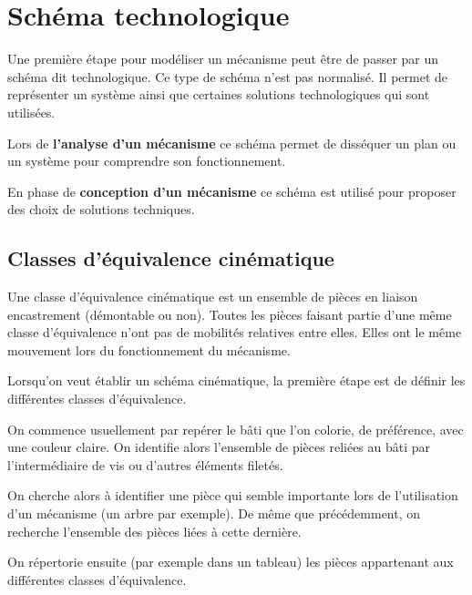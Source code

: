 \documentclass[10pt,oneside]{article}
\begin{document}
\section{Schéma technologique}
Une première étape pour modéliser un mécanisme peut être de passer par un schéma dit technologique. Ce type de schéma n'est pas normalisé. Il permet de représenter un système ainsi que certaines solutions technologiques qui sont utilisées. 

Lors de \textbf{l'analyse d'un mécanisme} ce schéma permet de disséquer un plan ou un système pour comprendre son fonctionnement. 

En phase de \textbf{conception d'un mécanisme} ce schéma est utilisé pour proposer des choix de solutions techniques. 

\subsection{Classes d'équivalence cinématique}

\begin{defi}
Une classe d'équivalence cinématique est un ensemble de pièces en liaison encastrement (démontable ou non). Toutes les pièces faisant partie d'une même classe d'équivalence n'ont pas de mobilités relatives entre elles. Elles ont le même mouvement lors du fonctionnement du mécanisme.
\end{defi}

Lorsqu'on veut établir un schéma cinématique, la première étape est de définir les différentes classes d'équivalence. 

\begin{methode}
On commence usuellement par repérer le bâti que l'on colorie, de préférence, avec une couleur claire. On identifie alors l'ensemble de pièces reliées au bâti par l'intermédiaire de vis ou d'autres éléments filetés.

On cherche alors à identifier une pièce qui semble importante lors de l'utilisation d'un mécanisme (un arbre par exemple). De même que précédemment, on recherche l'ensemble des pièces liées à cette dernière.

On répertorie ensuite (par exemple dans un tableau) les pièces appartenant aux différentes classes d'équivalence.
\end{methode}
\end{document}
